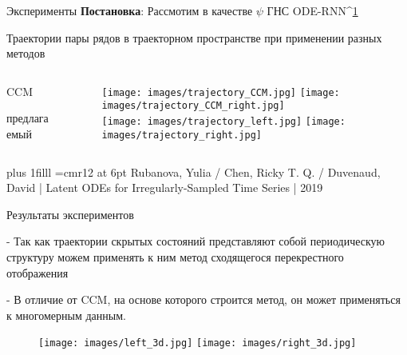 \documentclass{beamer}
\newcommand{\btVFill}{\vskip0pt plus 1filll}
\begin{document}
	\begin{frame}{Эксперименты}
		\textbf{Постановка}: Рассмотим в качестве $\psi$ ГНС ODE-RNN^{\hyperref[paper]{1}}
		
		Траектории пары рядов в траекторном пространстве при применении разных методов
		
		\begin{columns}
			\begin{column}{0.1\textwidth}
				
				CCM
				\newline
				\newline
				\newline
				
				
				предлагаемый
				
			\end{column}
			
			\begin{column}{0.8\textwidth}
				
				\begin{figure}
					\texttt{[image: images/trajectory\_CCM.jpg]}
					\texttt{[image: images/trajectory\_CCM\_right.jpg]}  
					\\[\smallskipamount]
					\texttt{[image: images/trajectory\_left.jpg]}
					\texttt{[image: images/trajectory\_right.jpg]}
				\end{figure}
				
			\end{column}
		\end{columns} 
		
		
		\btVFill
		\hline
		\font\myfont=cmr12 at 6pt
		\label{paper}
		\myfont Rubanova, Yulia / Chen, Ricky T. Q. / Duvenaud, David | Latent ODEs for Irregularly-Sampled Time Series | 2019
	\end{frame}
	
	
	
	\begin{frame}{Результаты экспериментов}
		
		- Так как траектории скрытых состояний представляют собой периодическую структуру можем применять к ним метод сходящегося перекрестного отображения
		
		- В отличие от CCM, на основе которого строится метод, он может применяться к многомерным данным. 
		
		\begin{figure}
			\texttt{[image: images/left\_3d.jpg]}
			\texttt{[image: images/right\_3d.jpg]}
		\end{figure}
	\end{frame}
	
\end{document}
